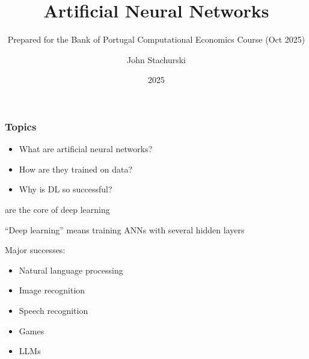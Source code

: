 

\title{Artificial Neural Networks}
\subtitle{Prepared for the Bank of Portugal Computational Economics Course (Oct 2025)}

\author{John Stachurski}


\date{2025}




\begin{frame}
  \titlepage
\end{frame}



\begin{frame}
    \frametitle{Topics}

    \begin{itemize}
        \item What are artificial neural networks?
        \vspace{0.5em}
        \item How are they trained on data?
        \vspace{0.5em}
        \item Why is DL so successful?
        \vspace{0.5em}
    \end{itemize}

\end{frame}


\begin{frame}
    
     are the core of deep learning

        \vspace{0.5em}
    ``Deep learning'' means training ANNs with several hidden layers

        \vspace{0.5em}
    Major successes:
    \begin{itemize}
        \item Natural language processing
        \vspace{0.3em}
        \item Image recognition
        \vspace{0.3em}
        \item Speech recognition
        \vspace{0.3em}
        \item Games
        \vspace{0.3em}
        \item LLMs
    \end{itemize}

\end{frame}


